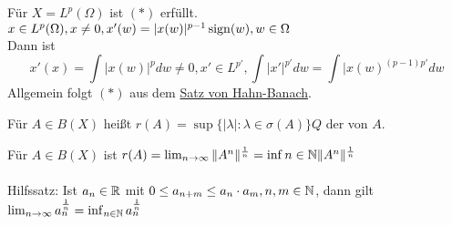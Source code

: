 \begin{bemerkung} \label{bem:13.7}
	Für $X = L^{p}(\Omega)$ ist \hyperref[eq:13.6.5-DualAbbildungAuf0]{$(*)$} erfüllt. $x \in L^{p}(\Omega), x \neq 0, x'(w) = |x(w)|^{p-1} \operatorname{sign}(w), w \in \Omega$ \\
	Dann ist 
	\[ x'(x) = \int | x(w) |^{p} dw \neq 0, x' \in L^{p'}, \int |x'|^{p'} dw = \int |x(w)^{(p-1)p'} dw \]
	Allgemein folgt \hyperref[eq:13.6.5-DualAbbildungAuf0]{$(*)$} aus dem \hyperref[satz:x-1-hahn-banach]{Satz von Hahn-Banach}. 
\end{bemerkung}


\begin{definition} \label{def:13.8-Spektralradius}
	Für $A \in B(X)$ hei{\ss}t $r(A) = \sup \{ | \lambda |: \lambda \in \sigma(A) \}Q$ der  von $A$.
\end{definition}


\begin{satz} \label{satz:13.9}
	Für $A \in B(X)$ ist $r(A) = \lim_{n \rightarrow \infty} \| A^{n} \|^{\frac{1}{n}} = \inf{n \in \ensuremath{\mathbb{N}}} \| A^{n} \|^{\frac{1}{n}}$ \\ \\
	Hilfssatz: Ist $a_{n} \in \mathbb{R}$ mit $0 \leq a_{n + m} \leq a_{n} \cdot a_{m}, n,m \in \mathbb{N}$, dann gilt $\lim_{n \rightarrow \infty} a_{n}^{\frac{1}{n}} = \inf_{n \in \mathbb{N}} a_{n}^{\frac{1}{n}}$
\end{satz}


